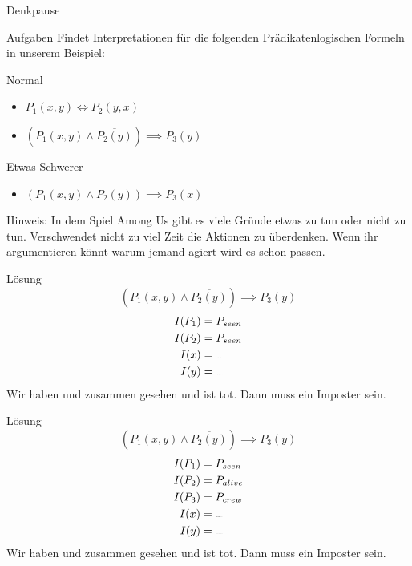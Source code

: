 {
\begin{frame}[fragile]{Denkpause}
	\footnotesize
	\begin{alertblock}{Aufgaben}
		Findet Interpretationen für die folgenden Prädikatenlogischen Formeln in unserem Beispiel:
	\end{alertblock}
	\begin{block}{Normal}
		\begin{itemize}
			\item $P_1(x,y) \Leftrightarrow P_2(y,x)$
			\item $(P_1(x,y) \wedge \overline{P_2(y)}) \implies P_3(y)$
		\end{itemize}
	\end{block}
	\begin{block}{Etwas Schwerer}
		\begin{itemize}
			\item $(P_1(x,y) \wedge P_2(y)) \implies P_3(x)$
		\end{itemize}
	\end{block}
	\alert{Hinweis:} In dem Spiel Among Us gibt es viele Gründe etwas zu tun oder nicht zu tun.
	Verschwendet nicht zu viel Zeit die Aktionen zu überdenken. Wenn ihr argumentieren könnt warum jemand agiert wird es schon passen.
\end{frame}

\begin{frame}{Lösung}
	$$(P_1(x,y) \wedge \overline{P_2(y)}) \implies P_3(y)$$
	\begin{align*}
		I(P_1) & = P_{seen}     \\
		I(P_2) & = P_{seen}     \\
		I(x)   & = \sus{blue}   \\
		I(y)   & = \sus{yellow}
	\end{align*}
	Wir haben  und  zusammen gesehen und  ist tot. Dann muss  ein Imposter sein.
\end{frame}

\begin{frame}{Lösung}
	$$(P_1(x,y) \wedge \overline{P_2(y)}) \implies P_3(y)$$
	\begin{align*}
		I(P_1) & = P_{seen}    \\
		I(P_2) & = P_{alive}   \\
		I(P_3) & = P_{crew}    \\
		I(x)   & = \sus{red}   \\
		I(y)   & = \sus{green}
	\end{align*}
	Wir haben  und  zusammen gesehen und  ist tot. Dann muss  ein Imposter sein.
\end{frame}

}
